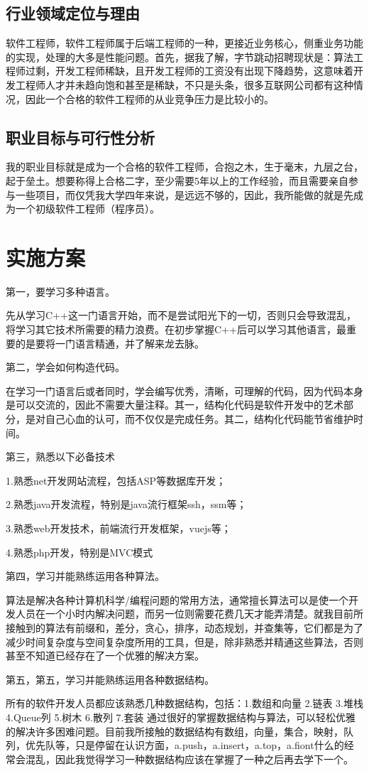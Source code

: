 \documentclass{article}
\begin{document}
	\subsection{行业领域定位与理由}
	软件工程师，软件工程师属于后端工程师的一种，更接近业务核心，侧重业务功能的实现，处理的大多是性能问题。首先，据我了解，字节跳动招聘现状是：算法工程师过剩，开发工程师稀缺，且开发工程师的工资没有出现下降趋势，这意味着开发工程师人才并未趋向饱和甚至是稀缺，不只是头条，很多互联网公司都有这种情况，因此一个合格的软件工程师的从业竞争压力是比较小的。\par
	\subsection{职业目标与可行性分析}
	我的职业目标就是成为一个合格的软件工程师，合抱之木，生于毫末，九层之台，起于垒土。想要称得上合格二字，至少需要5年以上的工作经验，而且需要亲自参与一些项目，而仅凭我大学四年来说，是远远不够的，因此，我所能做的就是先成为一个初级软件工程师（程序员）。\par
	
	\section{实施方案}
	第一，要学习多种语言。\par
	先从学习C++这一门语言开始，而不是尝试阳光下的一切，否则只会导致混乱，将学习其它技术所需要的精力浪费。在初步掌握C++后可以学习其他语言，最重要的是要将一门语言精通，并了解来龙去脉。\par
	第二，学会如何构造代码。\par
	在学习一门语言后或者同时，学会编写优秀，清晰，可理解的代码，因为代码本身是可以交流的，因此不需要大量注释。其一，结构化代码是软件开发中的艺术部分，是对自己心血的认可，而不仅仅是完成任务。其二，结构化代码能节省维护时间。\par
	第三，熟悉以下必备技术\par
	1.熟悉net开发网站流程，包括ASP等数据库开发；\par
	2.熟悉java开发流程，特别是java流行框架ssh，ssm等；\par
	3.熟悉web开发技术，前端流行开发框架，vuejs等；\par
	4.熟悉php开发，特别是MVC模式\par
	第四，学习并能熟练运用各种算法。\par
	算法是解决各种计算机科学/编程问题的常用方法，通常擅长算法可以是使一个开发人员在一个小时内解决问题，而另一位则需要花费几天才能弄清楚。就我目前所接触到的算法有前缀和，差分，贪心，排序，动态规划，并查集等，它们都是为了减少时间复杂度与空间复杂度所用的工具，但是，除非熟悉并精通这些算法，否则甚至不知道已经存在了一个优雅的解决方案。\par
	第五，第五，学习并能熟练运用各种数据结构。\par
	所有的软件开发人员都应该熟悉几种数据结构，包括：1.数组和向量 2.链表 3.堆栈 4.Queue列 5.树木 6.散列 7.套装 通过很好的掌握数据结构与算法，可以轻松优雅的解决许多困难问题。目前我所接触的数据结构有数组，向量，集合，映射，队列，优先队等，只是停留在认识方面，a.push，a.insert，a.top，a.fiont什么的经常会混乱，因此我觉得学习一种数据结构应该在掌握了一种之后再去学下一个。\par
	
\end{document}
